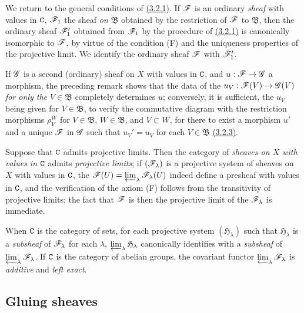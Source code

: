 \begin{env}[3.2.5]
\label{env-0.3.2.5}
We return to the general conditions of \hyperref[env-0.3.2.1]{(3.2.1)}. If $\mathscr{F}$ is an
ordinary {\em sheaf} with values in $\mathtt{C}$, $\mathscr{F}_1$ the sheaf {\em on
$\mathfrak{B}$} obtained by the restriction of $\mathscr{F}$ to $\mathfrak{B}$, then
the ordinary sheaf $\mathscr{F}_1'$ obtained from $\mathscr{F}_1$ by the procedure of
\hyperref[env-0.3.2.1]{(3.2.1)} is canonically isomorphic to $\mathscr{F}$, by virtue of the
condition (F) and the uniqueness properties of the projective limit. We identify
the ordinary sheaf $\mathscr{F}$ with $\mathscr{F}_1'$.

If $\mathscr{G}$ is a second (ordinary) sheaf on $X$ with values in $\mathtt{C}$, and
$u:\mathscr{F}\to\mathscr{G}$ a morphism, the preceding remark shows that the data of the
$u_V:\mathscr{F}(V)\to\mathscr{G}(V)$ {\em for only the $V\in\mathfrak{B}$} completely
determines $u$; conversely, it is sufficient, the $u_V$ being given for
$V\in\mathfrak{B}$, to verify the commutative diagram with the restriction
morphisms $\rho_V^W$ for $V\in\mathfrak{B}$, $W\in\mathfrak{B}$, and
$V\subset W$, for there to exist a morphism $u'$ and a unique $\mathscr{F}$ in
$\mathscr{G}$ such that $u_V'=u_V$ for each $V\in\mathfrak{B}$ \hyperref[env-0.3.2.3]{(3.2.3)}.
\end{env}

\begin{env}[3.2.6]
\label{env-0.3.2.6}
Suppose that $\mathtt{C}$ admits projective limits. Then the category of {\em sheaves
on $X$ with values in $\mathtt{C}$} admits {\em projective limits}; if
$(\mathscr{F}_\lambda)$ is a projective system of sheaves on $X$ with values in $\mathtt{C}$,
the $\mathscr{F}(U)=\varprojlim_\lambda\mathscr{F}_\lambda(U)$ indeed define a presheaf
with values in $\mathtt{C}$, and the verification of the axiom (F) follows from the
transitivity of projective limits; the fact that $\mathscr{F}$ is then the projective
limit of the $\mathscr{F}_\lambda$ is immediate.

When $\mathtt{C}$ is the category of sets, for each projective system
$(\mathfrak{H}_\lambda)$ such
that $\mathfrak{H}_\lambda$ is a {\em subsheaf} of $\mathscr{F}_\lambda$ for each
$\lambda$, $\varprojlim_\lambda\mathfrak{H}_\lambda$ canonically identifies with
a {\em subsheaf} of $\varprojlim_\lambda\mathscr{F}_\lambda$. If $\mathtt{C}$ is the
category of abelian groups, the covariant functor
$\varprojlim_\lambda\mathscr{F}_\lambda$ is {\em additive} and {\em left exact}.
\end{env}

\subsection{Gluing sheaves}
\label{subsection-gluing-sheaves}

